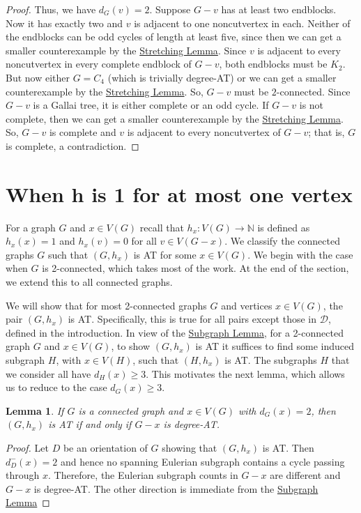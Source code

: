 \documentclass[12pt]{article}
\theoremstyle{plain}
\newtheorem{lem}[thm]{Lemma}
\theoremstyle{definition}
\theoremstyle{remark}
\newcommand{\fancy}[1]{\mathcal{#1}}
\newcommand{\IN}{\mathbb{N}}
\newcommand{\D}{\fancy{D}}
\newcommand{\func}[3]{#1\colon #2 \rightarrow #3}
\def\D{\fancy{D}}
\begin{document}
\begin{proof}
Thus, we have $d_G(v) = 2$.  Suppose $G-v$ has at least two endblocks. 
Now it has exactly two and $v$ is adjacent to one noncutvertex in each. 
Neither of the endblocks can be odd cycles of length at least five, since then
we can get a smaller counterexample by the \hyperref[SubdivideTwice]{Stretching
Lemma}.  Since $v$ is adjacent to every noncutvertex in every
complete endblock of $G-v$, both endblocks must be $K_2$.  But now either
$G=C_4$ (which is trivially degree-AT) or we can get a smaller counterexample
by the \hyperref[SubdivideTwice]{Stretching Lemma}.  So, $G-v$ must be
$2$-connected. Since $G-v$ is a Gallai tree, it is either complete or an odd
cycle.  If $G-v$ is not complete, then we can get a smaller counterexample by
the \hyperref[SubdivideTwice]{Stretching Lemma}.  So, $G-v$ is complete and
$v$ is adjacent to every
noncutvertex of $G-v$; that is, $G$ is complete, a contradiction.
\end{proof}

\section{When h is 1 for at most one vertex}
\label{MainThmSec}
For a graph $G$ and $x \in V(G)$ recall that $\func{h_x}{V(G)}{\IN}$ is defined
as $h_x(x) = 1$ and $h_x(v) = 0$ for all $v \in V(G-x)$. We classify the
connected 
graphs $G$ such that $(G,h_x)$ is AT for some $x \in V(G)$. 
We begin with the case when $G$ is 2-connected, which takes most of the work.
At the end of the section, we extend this to all connected graphs.

We will show that for most 2-connected graphs $G$ and vertices $x\in V(G)$, the
pair $(G,h_x)$ is AT.  Specifically, this is true for all pairs except those in
$\D$, defined in the introduction.  In view of the
\hyperref[InducedSubgraph]{Subgraph Lemma}, for
a 2-connected graph $G$ and $x\in V(G)$, to show $(G,h_x)$ is AT it suffices to
find some induced subgraph $H$, with $x\in V(H)$, such that $(H,h_x)$ is AT. 
The subgraphs $H$ that we consider all have $d_H(x)\ge 3$.  This motivates the
next lemma, which allows us to reduce to the case $d_G(x)\ge 3$.

\begin{lem}\label{DegreeTwoVertex}
If $G$ is a connected graph and $x \in V(G)$ with $d_G(x) = 2$, then $(G,h_x)$
is AT if and only if $G-x$ is degree-AT.
\end{lem}
\begin{proof}
Let $D$ be an orientation of $G$ showing that $(G,h_x)$ is AT.  Then
$d_{D}^-(x) = 2$ and hence no spanning Eulerian subgraph contains a cycle
passing through $x$.  Therefore, the Eulerian subgraph counts in $G-x$ are
different and $G-x$ is degree-AT.  The other direction is immediate from the
\hyperref[InducedSubgraph]{Subgraph Lemma}
\end{proof}
\end{document}
